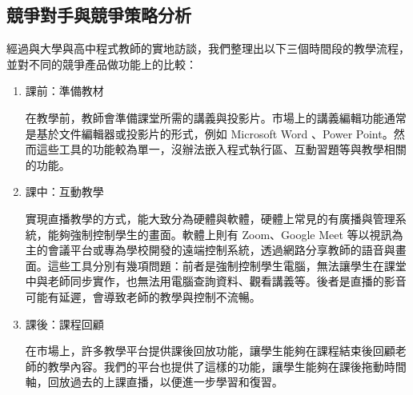 \subsection{競爭對手與競爭策略分析}

經過與大學與高中程式教師的實地訪談，我們整理出以下三個時間段的教學流程，並對不同的競爭產品做功能上的比較：

\begin{enumerate}
  \setlength{\parindent}{2em}
  \item 課前：準備教材
    \par 在教學前，教師會準備課堂所需的講義與投影片。市場上的講義編輯功能通常是基於文件編輯器或投影片的形式，例如 Microsoft Word 、Power Point。然而這些工具的功能較為單一，沒辦法嵌入程式執行區、互動習題等與教學相關的功能。
    \item 課中：互動教學
      \par 實現直播教學的方式，能大致分為硬體與軟體，硬體上常見的有廣播與管理系統，能夠強制控制學生的畫面。軟體上則有 Zoom、Google Meet 等以視訊為主的會議平台或專為學校開發的遠端控制系統，透過網路分享教師的語音與畫面。這些工具分別有幾項問題：前者是強制控制學生電腦，無法讓學生在課堂中與老師同步實作，也無法用電腦查詢資料、觀看講義等。後者是直播的影音可能有延遲，會導致老師的教學與控制不流暢。
  \item 課後：課程回顧
  \par 在市場上，許多教學平台提供課後回放功能，讓學生能夠在課程結束後回顧老師的教學內容。我們的平台也提供了這樣的功能，讓學生能夠在課後拖動時間軸，回放過去的上課直播，以便進一步學習和復習。
\end{enumerate}

